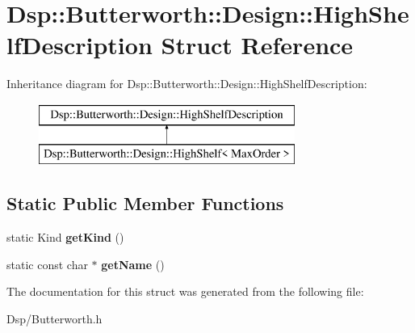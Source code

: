 \hypertarget{structDsp_1_1Butterworth_1_1Design_1_1HighShelfDescription}{\section{Dsp\-:\-:Butterworth\-:\-:Design\-:\-:High\-Shelf\-Description Struct Reference}
\label{structDsp_1_1Butterworth_1_1Design_1_1HighShelfDescription}
}
Inheritance diagram for Dsp\-:\-:Butterworth\-:\-:Design\-:\-:High\-Shelf\-Description\-:\begin{figure}[H]
\begin{center}
\leavevmode
\includegraphics[height=2.000000cm]{structDsp_1_1Butterworth_1_1Design_1_1HighShelfDescription}
\end{center}
\end{figure}
\subsection*{Static Public Member Functions}
\begin{DoxyCompactItemize}
\item 
\hypertarget{structDsp_1_1Butterworth_1_1Design_1_1HighShelfDescription_a8983b1109dd60eaa0d0b5bb5743c5407}{static Kind {\bfseries get\-Kind} ()}\label{structDsp_1_1Butterworth_1_1Design_1_1HighShelfDescription_a8983b1109dd60eaa0d0b5bb5743c5407}

\item 
\hypertarget{structDsp_1_1Butterworth_1_1Design_1_1HighShelfDescription_a467b5678601e2a1c4ed3aab0216b163e}{static const char $\ast$ {\bfseries get\-Name} ()}\label{structDsp_1_1Butterworth_1_1Design_1_1HighShelfDescription_a467b5678601e2a1c4ed3aab0216b163e}

\end{DoxyCompactItemize}


The documentation for this struct was generated from the following file\-:\begin{DoxyCompactItemize}
\item 
Dsp/Butterworth.\-h\end{DoxyCompactItemize}
